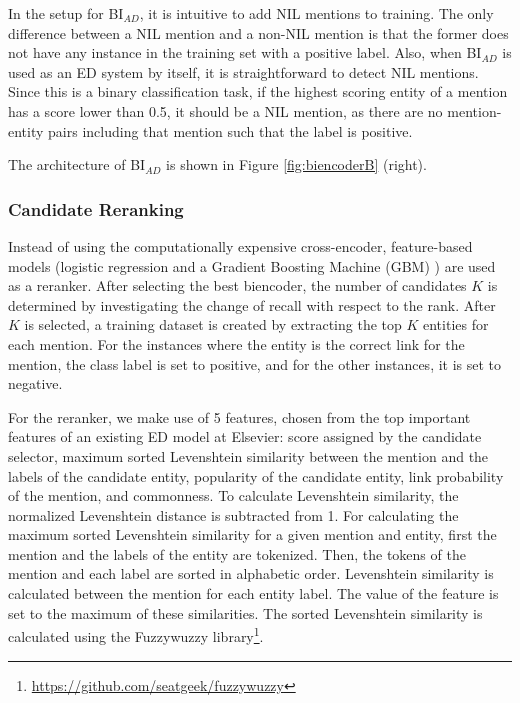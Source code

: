 \documentclass{report}
\theoremstyle{definition}
\theoremstyle{remark}
\begin{document}
In the setup for BI$_{AD}$, it is intuitive to add NIL mentions to training. The only difference between a NIL mention and a non-NIL mention is that the former does not have any instance in the training set with a positive label. Also, when BI$_{AD}$ is used as an ED system by itself, it is straightforward to detect NIL mentions. Since this is a binary classification task, if the highest scoring entity of a mention has a score lower than 0.5, it should be a NIL mention, as there are no mention-entity pairs including that mention such that the label is positive. 

The architecture of BI$_{AD}$ is shown in Figure \ref{fig:biencoderB} (right).

\subsubsection{Candidate Reranking}
Instead of using the computationally expensive cross-encoder, feature-based models (logistic regression and a Gradient Boosting Machine (GBM) \cite{GBM}) are used as a reranker. After selecting the best biencoder, the number of candidates $K$ is determined by investigating the change of recall with respect to the rank. After $K$ is selected, a training dataset is created by extracting the top $K$ entities for each mention. For the instances where the entity is the correct link for the mention, the class label is set to positive, and for the other instances, it is set to negative.

For the reranker, we make use of 5 features, chosen from the top important features of an existing ED model at Elsevier: score assigned by the candidate selector, maximum sorted Levenshtein similarity between the mention and the labels of the candidate entity, popularity of the candidate entity, link probability of the mention, and commonness. To calculate Levenshtein similarity, the normalized Levenshtein distance is subtracted from 1. For calculating the maximum sorted Levenshtein similarity for a given mention and entity, first the mention and the labels of the entity are tokenized. Then, the tokens of the mention and each label are sorted in alphabetic order. Levenshtein similarity is calculated between the mention for each entity label. The value of the feature is set to the maximum of these similarities. The sorted Levenshtein similarity is calculated using the Fuzzywuzzy library\footnote{\url{https://github.com/seatgeek/fuzzywuzzy}}.
\end{document}
